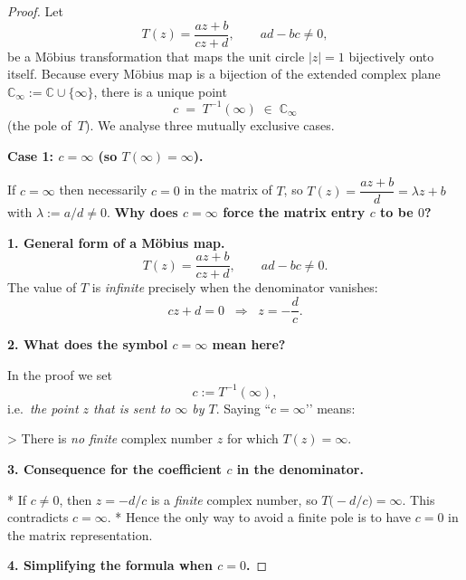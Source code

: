 \documentclass[12pt]{article}
\theoremstyle{definition} %
\theoremstyle{plain} %
\begin{document}
%
%
%
%
\begin{proof}
   Let
   \[
      T(z)=\frac{az+b}{cz+d},\qquad ad-bc\neq0,
   \]
   be a Möbius transformation that maps the unit circle
   $\lvert z\rvert=1$ bijectively onto itself.
   Because every Möbius map is a bijection of the extended complex
   plane $\mathbb{{C}}_\infty:=\mathbb{{C}}\cup\{\infty\}$, there is a unique point
   \[
      c \;=\; T^{-1}(\infty)\;\in\;\mathbb{{C}}_\infty
   \]
   (the pole of~$T$).
   We analyse three mutually exclusive cases.
   
   \bigskip
   \noindent\textbf{Case 1: $c=\infty$ (so $T(\infty)=\infty$).}
   
   If $c=\infty$ then necessarily $c=0$ in the matrix of $T$, so
   \(
      T(z)=\dfrac{az+b}{d}=\lambda z+b
   \)
   with $\lambda:=a/d\neq0$.
   \textbf{Why does $c=\infty$ force the matrix entry $c$ to be $0$?}

\medskip
\textbf{1.  General form of a Möbius map.}
\[
   T(z)=\frac{az+b}{cz+d},\qquad ad-bc\neq0.
\]
The value of $T$ is \emph{infinite} precisely when the denominator
vanishes:
\[
   cz+d = 0
   \;\;\Longrightarrow\;\;
   z = -\frac{d}{c}.
\]

\medskip
\textbf{2.  What does the symbol $c=\infty$ mean here?}

In the proof we set
\[
   c:=T^{-1}(\infty),
\]
i.e.\ \emph{the point $z$ that is sent to $\infty$ by $T$}.
Saying “$c=\infty$’’ means:

> There is \emph{no finite} complex number $z$ for which $T(z)=\infty$.

\medskip
\textbf{3.  Consequence for the coefficient $c$ in the denominator.}

* If $c\neq 0$, then $z=-d/c$ is a \emph{finite} complex number, so
  $T\bigl(-d/c\bigr)=\infty$.  
  This contradicts $c=\infty$.
* Hence the only way to avoid a finite pole is to have $c=0$ in the
  matrix representation.

\medskip
\textbf{4.  Simplifying the formula when $c=0$.}


\end{proof}
\end{document}
